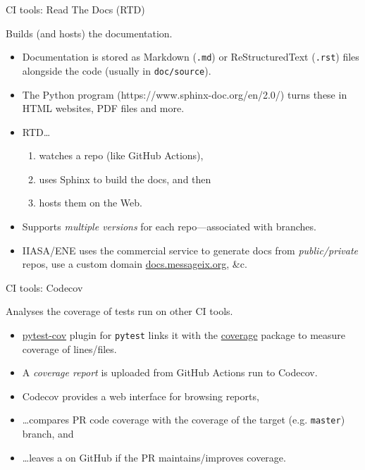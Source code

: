 \documentclass[12pt,aspectratio=169]{beamer}
\begin{document}
\begin{frame}{CI tools: Read The Docs (RTD)}

{\Large Builds (and hosts) the documentation.}

\bigskip
\begin{itemize}
  \item Documentation is stored as Markdown (\texttt{.md}) or ReStructuredText (\texttt{.rst}) files alongside the code (usually in \texttt{doc/source}).
  \item The Python program  (https://www.sphinx-doc.org/en/2.0/) turns these in HTML websites, PDF files and more.
  \item RTD…
    \begin{enumerate}
      \item watches a repo (like GitHub Actions),
      \item uses Sphinx to build the docs, and then
      \item hosts them on the Web.
    \end{enumerate}
  \item Supports \emph{multiple versions} for each repo—associated with branches.
  \item IIASA/ENE uses the commercial service to generate docs from \emph{public/private} repos, use a custom domain \href{https://docs.messageix.org}{docs.messageix.org}, \&c.
\end{itemize}

\end{frame}

\begin{frame}{CI tools: Codecov}

{\Large Analyses the coverage of tests run on other CI tools.}

\bigskip
\begin{itemize}
  \item \href{https://pytest-cov.readthedocs.io}{\ttfamily pytest-cov} plugin for \texttt{pytest} links it with the \href{https://github.com/nedbat/coveragepy}{\ttfamily coverage} package to measure coverage of lines/files.
  \item A \emph{coverage report} is uploaded from GitHub Actions run to Codecov.
  \item Codecov provides a web interface for browsing reports,
  \item …compares PR code coverage with the coverage of the target (e.g. \texttt{master}) branch, and
  \item …leaves a  on GitHub if the PR maintains/improves coverage.
\end{itemize}

\end{frame}
\end{document}
